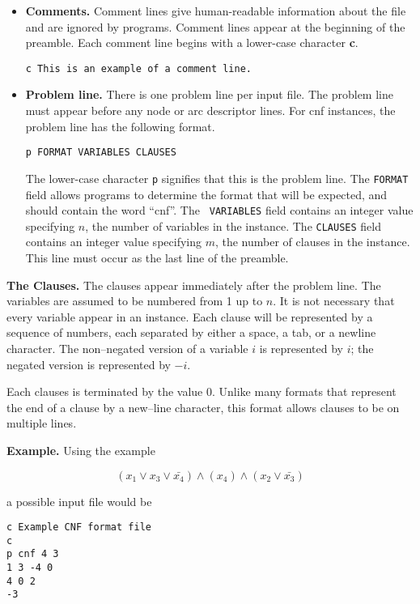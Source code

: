 \documentclass[12pt]{article}
\begin{document}
\begin{itemize}
\item {\bf Comments.} Comment lines give human-readable 
information about the file and are ignored by programs.  Comment lines
appear at the beginning of the preamble.  Each comment line begins with a
lower-case character {\bf c}.
\begin{verbatim} 
c This is an example of a comment line.
\end{verbatim} 

\item {\bf Problem line.}  There is one problem line per input file.  The 
problem line must appear before any node or arc descriptor lines.  For
cnf instances, the problem line has the following format.
\begin{verbatim}
p FORMAT VARIABLES CLAUSES
\end{verbatim} 

The lower-case character {\tt p} signifies that this is the problem
line.  The {\tt FORMAT} field allows programs to determine the format
that will be expected, and should contain the word ``cnf''.  The {\tt
VARIABLES} field contains an integer value specifying $n$, the number
of variables in the instance.  The {\tt CLAUSES} field contains an
integer value specifying $m$, the number of clauses in the instance.
This line must occur as the last line of the preamble.

\end{itemize}

{\bf The Clauses.}  The clauses appear immediately after the problem
line.  The variables are assumed to be numbered from 1 up to $n$.  It
is not necessary that every variable appear in an instance.
Each clause will be represented by a sequence of numbers, each
separated by either a space, a tab, or a newline character.  The
non--negated version of a variable $i$ is represented by $i$;  the
negated version is represented by $-i$.

Each clauses is terminated by the value 0.  Unlike many formats that
represent the end of a clause by a new--line character, this format
allows clauses to be on multiple lines. 

\bigskip
{\bf Example.}  Using the example 

$$(x_1\vee x_3\vee \bar{x_4})\wedge (x_4)\wedge (x_2\vee \bar{x_3})$$

\noindent a possible input file would be

\begin{verbatim}
c Example CNF format file
c
p cnf 4 3
1 3 -4 0
4 0 2
-3
\end{verbatim}
\end{document}
